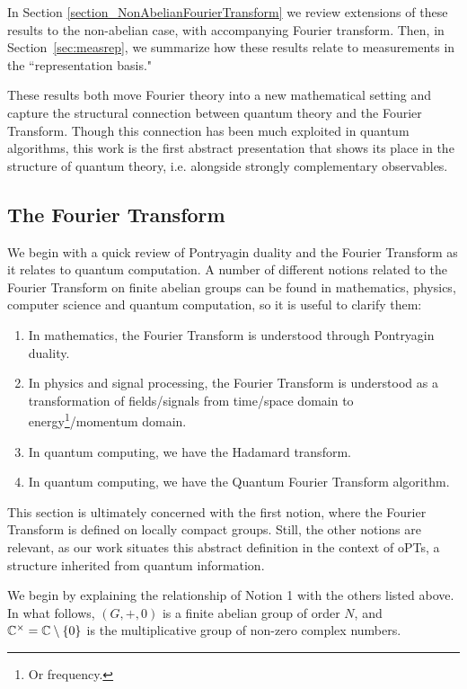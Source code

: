In Section \ref{section_NonAbelianFourierTransform} we review extensions of these results to the non-abelian case, with accompanying Fourier transform. Then, in Section~\ref{sec:measrep}, we summarize how these results relate to measurements in the ``representation basis."

These results both move Fourier theory into a new mathematical setting and capture the structural connection between quantum theory and the Fourier Transform.  Though this connection has been much exploited in quantum algorithms, this work is the first abstract presentation that shows its place in the structure of quantum theory, i.e. alongside strongly complementary observables.
\subsection{The Fourier Transform}
\label{sec:FT}
We begin with a quick review of Pontryagin duality and the Fourier Transform as it relates to quantum computation. A number of different notions related to the Fourier Transform on finite abelian groups can be found in mathematics, physics, computer science and quantum computation, so it is useful to clarify them:

\begin{enumerate}
  \item[1.] In mathematics, the Fourier Transform is understood through Pontryagin duality.
  \item[2.] In physics and signal processing, the Fourier Transform is understood as a transformation of fields/signals from time/space domain to energy\footnote{Or frequency.}/momentum domain.
  \item[3.] In quantum computing, we have the Hadamard transform.
  \item[4.] In quantum computing, we have the Quantum Fourier Transform algorithm.
\end{enumerate}

This section is ultimately concerned with the first notion, where the Fourier Transform is defined on locally compact groups. Still, the other notions are relevant, as our work situates this abstract definition in the context of oPTs, a structure inherited from quantum information. 

We begin by explaining the relationship of Notion 1 with the others listed above. In what follows, $(G,+,0)$ is a finite abelian group of order $N$, and $\mathbb{C}^{\times}=\mathbb{C}\setminus\{0\}$ is the multiplicative group of non-zero complex numbers.

